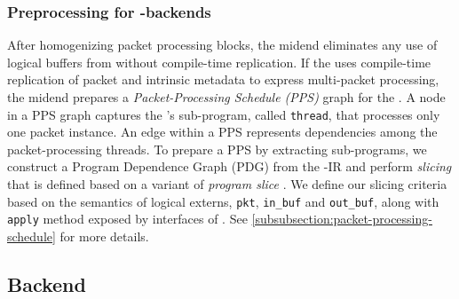 \documentclass[letterpaper,twocolumn,10pt]{article}
\begin{document}
\subsubsection{Preprocessing for \ucomp-backends}
After homogenizing packet processing blocks, the midend eliminates any
use of logical buffers from \uprograms without compile-time
replication. If the \uprograms uses compile-time replication of packet
and intrinsic metadata to express multi-packet processing, the midend
prepares a \emph{Packet-Processing Schedule (PPS)} graph for the
\uprogram. A node in a PPS graph captures the \uprogram's sub-program,
called \texttt{thread}, that processes only one packet instance. An
edge within a PPS represents dependencies among the packet-processing
threads. To prepare a PPS by extracting sub-programs, we construct a
Program Dependence Graph (PDG) \cite{Ferrante:1987:PDG:24039.24041}
from the \uprogram-IR and perform \emph{slicing} that is defined based
on a variant of \emph{program slice}
\cite{Weiser:1981:PS:800078.802557}. We define our slicing criteria
based on the semantics of logical externs, \texttt{pkt},
\texttt{in\_buf} and \texttt{out\_buf}, along with \texttt{apply}
method exposed by interfaces of \uarch. See
\cref{subsubsection:packet-processing-schedule} for more details.







\subsection{\ucomp Backend}
\label{subsection:micro-backend}
\end{document}
